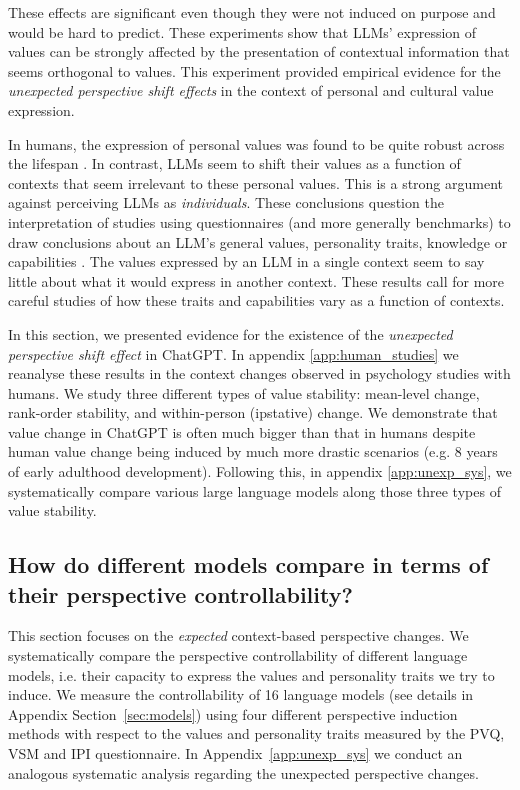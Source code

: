 These effects are significant even though they were not induced on purpose and would be hard to predict. These experiments show that LLMs' expression of values can be strongly affected by the presentation of contextual information that seems orthogonal to values. This experiment provided empirical evidence for the \textit{unexpected perspective shift effects} in the context of personal and cultural value expression. 

In humans, the expression of personal values was found to be quite robust across the lifespan \citep{values_stable}. In contrast, LLMs seem to shift their values as a function of contexts that seem irrelevant to these personal values. This is a strong argument against perceiving LLMs as \textit{individuals}.
These conclusions question the interpretation of studies using questionnaires (and more generally benchmarks) to draw conclusions about an LLM's general values, personality traits, knowledge or capabilities \citep{Binz2022UsingCP,Miotto2022-jq,sap2022neural}. The values expressed by an LLM in a single context seem to say little about what it would express in another context. These results call for more careful studies of how these traits and capabilities vary as a function of contexts. 

In this section, we presented evidence for the existence of the \textit{unexpected perspective shift effect} in ChatGPT. In appendix \ref{app:human_studies} we reanalyse these results in the context changes observed in psychology studies with humans. We study three different types of value stability: mean-level change, rank-order stability, and within-person (ipstative) change. We demonstrate that value change in ChatGPT is often much bigger than that in humans despite human value change being induced by much more drastic scenarios (e.g. 8 years of early adulthood development). Following this, in appendix \ref{app:unexp_sys}, we systematically compare various large language models along those three types of value stability.

\subsection{How do different models compare in terms of their perspective controllability?}
\label{sec:exp_contr_sys}

This section focuses on the \textit{expected} context-based perspective changes. We systematically compare the perspective controllability of different language models, i.e. their capacity to express the values and personality traits we try to induce. We measure the controllability of 16 language models (see details in Appendix Section~\ref{sec:models}) using four different perspective induction methods with respect to the values and personality traits measured by the PVQ, VSM and IPI questionnaire. In Appendix~\ref{app:unexp_sys} we conduct an analogous systematic analysis regarding the unexpected perspective changes.

